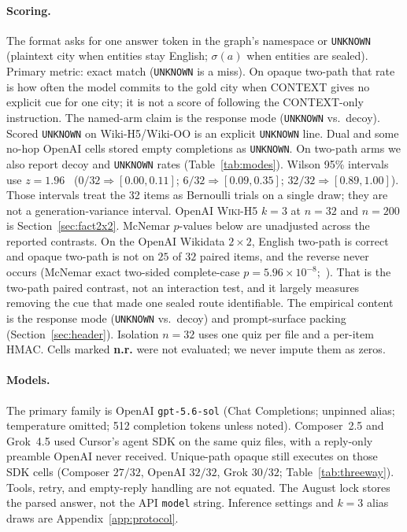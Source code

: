 \documentclass[10pt]{article} %
\begin{document}
\paragraph{Scoring.}
The format asks for one answer token in the graph's namespace or
\texttt{UNKNOWN} (plaintext city when entities stay English; $\sigma(a)$
when entities are sealed).
Primary metric: exact match (\texttt{UNKNOWN} is a miss).
On opaque two-path that rate is how often the model commits to the gold
city when CONTEXT gives no explicit cue for one city; it is not a score of
following the CONTEXT-only instruction.
The named-arm claim is the response mode (\texttt{UNKNOWN} vs.\ decoy).
Scored \texttt{UNKNOWN} on Wiki-H5/Wiki-OO is an explicit \texttt{UNKNOWN}
line. Dual and some no-hop OpenAI cells stored empty completions as
\texttt{UNKNOWN}. On two-path arms we also report decoy
and \texttt{UNKNOWN} rates (Table~\ref{tab:modes}).
Wilson 95\% intervals use $z{=}1.96$~\citep{wilson1927}
($0/32 \Rightarrow [0.00,0.11]$;
$6/32 \Rightarrow [0.09,0.35]$;
$32/32 \Rightarrow [0.89,1.00]$).
Those intervals treat the 32 items as Bernoulli trials on a single draw;
they are not a generation-variance interval. OpenAI \textsc{Wiki-H5} $k{=}3$
at $n{=}32$ and $n{=}200$ is Section~\ref{sec:fact2x2}.
McNemar $p$-values below are unadjusted across the reported contrasts.
On the OpenAI Wikidata $2{\times}2$, English two-path is correct and opaque
two-path is not on $25$ of $32$ paired items, and the reverse never occurs
(McNemar exact two-sided complete-case $p{=}5.96{\times}10^{-8}$;~\citealp{mcnemar1947}).
That is the two-path paired contrast, not an interaction test, and it
largely measures removing the cue that made one sealed route identifiable.
The empirical content is the response mode (\texttt{UNKNOWN} vs.\ decoy)
and prompt-surface packing (Section~\ref{sec:header}).
Isolation $n{=}32$ uses one quiz per file and a per-item HMAC. Cells marked
\textbf{n.r.} were not evaluated; we never impute them as zeros.

\paragraph{Models.}
The primary family is OpenAI \mbox{\texttt{gpt-5.6-sol}} (Chat Completions;
unpinned alias; temperature omitted; 512 completion tokens unless noted).
Composer~2.5 and Grok~4.5 used Cursor's agent SDK on the same quiz files,
with a reply-only preamble OpenAI never received.
Unique-path opaque still executes on those SDK cells (Composer $27/32$,
OpenAI $32/32$, Grok $30/32$; Table~\ref{tab:threeway}).
Tools, retry, and empty-reply handling are not equated.
The August lock stores the parsed answer, not the API \texttt{model}
string.
Inference settings and $k{=}3$ alias draws are Appendix~\ref{app:protocol}.
\end{document}
